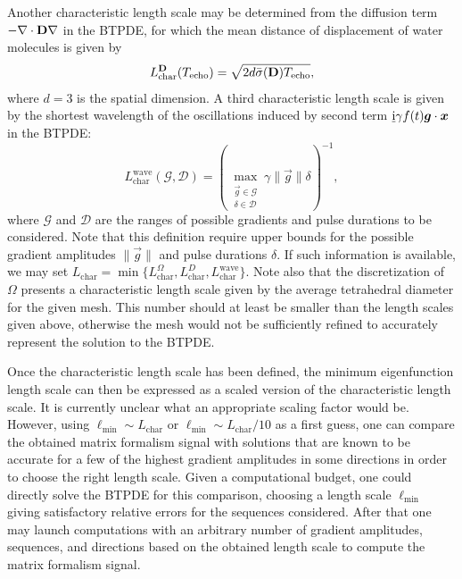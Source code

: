 \documentclass[a4paper]{article}
\begin{document}
Another characteristic length scale may be determined from the diffusion term $-\nabla \cdot \mathbf{D} \nabla$ in the BTPDE, for which the mean distance of displacement of water molecules is given by
\begin{equation}
    L_\text{char}^{\mathbf{D}}(T_\text{echo}) = \sqrt{2 d \bar{\sigma}(\mathbf{D}) T_\text{echo}},
\end{equation}
where $d = 3$ is the spatial dimension. A third characteristic length scale is given by the shortest wavelength of the oscillations induced by second term $\underline{\mathrm{i}} \gamma f(t) \bm{g} \cdot \bm{x}$ in the BTPDE:
\begin{equation}
    L_\text{char}^\text{wave}(\mathcal{G}, \mathcal{D}) = \left( \max_{\substack{\vec{g} \in \mathcal{G} \\ \delta \in \mathcal{D}}} \gamma \| \vec{g} \| \delta \right)^{-1},
\end{equation}
where $\mathcal{G}$ and $\mathcal{D}$ are the ranges of possible gradients and pulse durations to be considered. Note that this definition require upper bounds for the possible gradient amplitudes $\| \vec{g} \|$ and pulse durations $\delta$. If such information is available, we may set $L_\text{char} = \min \{ L_\text{char}^\Omega, L_\text{char}^D, L_\text{char}^\text{wave}\}$. Note also that the discretization of $\Omega$ presents a characteristic length scale given by the average tetrahedral diameter for the given mesh. This number should at least be smaller than the length scales given above, otherwise the mesh would not be sufficiently refined to accurately represent the solution to the BTPDE.

Once the characteristic length scale has been defined, the minimum eigenfunction length scale can then be expressed as a scaled version of the characteristic length scale. It is currently unclear what an appropriate scaling factor would be. However, using $\ell_\text{min} \sim L_\text{char}$ or $\ell_\text{min} \sim L_\text{char} / 10$ as a first guess, one can compare the obtained matrix formalism signal with solutions that are known to be accurate for a few of the highest gradient amplitudes in some directions in order to choose the right length scale. Given a computational budget, one could directly solve the BTPDE for this comparison, choosing a length scale $\ell_\text{min}$ giving satisfactory relative errors for the sequences considered. After that one may launch computations with an arbitrary number of gradient amplitudes, sequences, and directions based on the obtained length scale to compute the matrix formalism signal.
\end{document}
